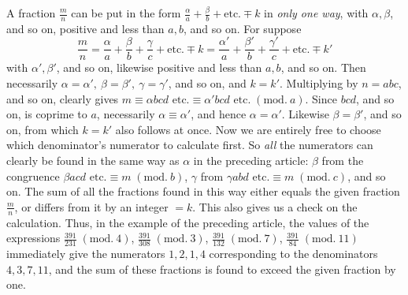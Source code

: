 A fraction \(\frac mn\) can be put in the form \(\frac\alpha a+\frac\beta b+\text{etc.}\mp k\) in \textit{only one way}, with \(\alpha,\beta\), and so on, positive and less than \(a,b\), and so on. For suppose \[\frac mn=\frac\alpha a+\frac\beta b+\frac\gamma c+\text{etc.}\mp k=\frac{\alpha'}a+\frac{\beta'}b+\frac{\gamma'}c+\text{etc.}\mp k'\]
with \(\alpha',\beta'\), and so on, likewise positive and less than \(a,b\), and so on. Then necessarily \(\alpha=\alpha',\ \beta=\beta',\ \gamma=\gamma'\), and so on, and \(k=k'\). Multiplying by \(n=abc\), and so on, clearly gives \(m\equiv\alpha bcd\text{ etc.}\equiv\alpha'bcd\text{ etc.}\; (\mathrm{mod}.\ a)\). Since \(bcd\), and so on, is coprime to \(a\), necessarily \(\alpha\equiv\alpha'\), and hence \(\alpha=\alpha'\). Likewise \(\beta=\beta'\), and so on, from which \(k=k'\) also follows at once. Now we are entirely free to choose which denominator's numerator to calculate first. So \textit{all} the numerators can clearly be found in the same way as \(\alpha\) in the preceding article: \(\beta\) from the congruence \(\beta acd\text{ etc.}\equiv m\; (\mathrm{mod}.\ b)\), \(\gamma\) from \(\gamma abd\text{ etc.}\equiv m\; (\mathrm{mod}.\ c)\), and so on. The sum of all the fractions found in this way either equals the given fraction \(\frac mn\), or differs from it by an integer \(=k\). This also gives us a check on the calculation. Thus, in the example of the preceding article, the values of the expressions \(\frac{391}{231}\; (\mathrm{mod}.\ 4)\), \(\frac{391}{308}\; (\mathrm{mod}.\ 3)\), \(\frac{391}{132}\; (\mathrm{mod}.\ 7)\), \(\frac{391}{84}\; (\mathrm{mod}.\ 11)\) immediately give the numerators \(1,2,1,4\) corresponding to the denominators \(4,3,7,11\), and the sum of these fractions is found to exceed the given fraction by one.
